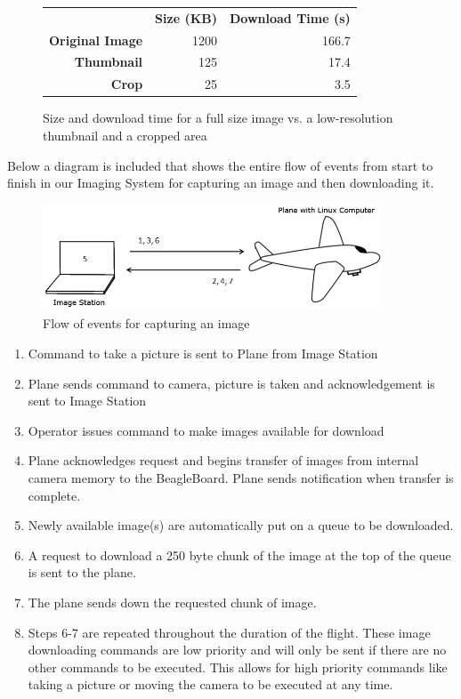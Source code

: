 \documentclass[pdftex,10pt,letter]{article}
\begin{document}
\begin{figure} [H]
	\centering
		\begin{tabular}{rrr}
		 & {\bf Size (KB)} & {\bf Download Time (s)} \\
		 {\bf Original Image} &        1200 &       166.7 \\
		 {\bf Thumbnail} &        125 &       17.4 \\
		 {\bf Crop} &         25 &        3.5 \\
		\end{tabular}
	\caption[Download Times for Images] {Size and download time for a full size image vs. a low-resolution thumbnail and a cropped area}
	\label{fig:imagedownloadtimes}
\end{figure}

Below a diagram is included that shows the entire flow of events from start to finish in our Imaging System for capturing an image and then downloading it.

\begin{figure} [H]
  \centering
  	\includegraphics[width=0.9\textwidth]{../images/CaptureProcess.jpg}
  	\caption[Image Capture Process]{Flow of events for capturing an image}
  	\label{fig:imagecaptureprocess}
\end{figure}

\begin{enumerate}
\item Command to take a picture is sent to Plane from Image Station
\item Plane sends command to camera, picture is taken and acknowledgement is sent to Image Station
\item Operator issues command to make images available for download
\item Plane acknowledges request and begins transfer of images from internal camera memory to the BeagleBoard.  Plane sends notification when transfer is complete.
\item Newly available image(s) are automatically put on a queue to be downloaded.
\item A request to download a 250 byte chunk of the image at the top of the queue is sent to the plane.
\item The plane sends down the requested chunk of image.
\item Steps 6-7 are repeated throughout the duration of the flight.  These image downloading commands are low priority and will only be sent if there are no other commands to be executed. This allows for high priority commands like taking a picture or moving the camera to be executed at any time.
\end{enumerate}
\end{document}
